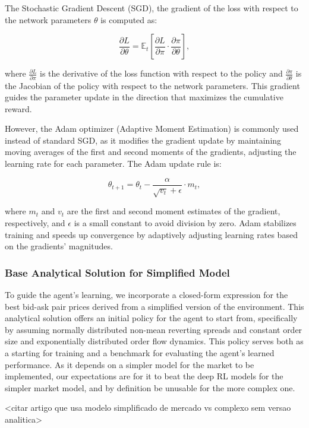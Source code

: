 The Stochastic Gradient Descent (SGD), the gradient of the loss with respect to the network parameters \( \theta \) is computed as:

$$
\frac{\partial L}{\partial \theta} = \mathbb{E}_t \left[ \frac{\partial L}{\partial \pi} \cdot \frac{\partial \pi}{\partial \theta} \right],
$$

where $\frac{\partial L}{\partial \pi}$ is the derivative of the loss function with respect to the policy and $\frac{\partial \pi}{\partial \theta}$ is the Jacobian of the policy with respect to the network parameters. This gradient guides the parameter update in the direction that maximizes the cumulative reward.

However, the Adam optimizer (Adaptive Moment Estimation) is commonly used instead of standard SGD, as it modifies the gradient update by maintaining moving averages of the first and second moments of the gradients, adjusting the learning rate for each parameter. The Adam update rule is:

$$
\theta_{t+1} = \theta_t - \frac{\alpha}{\sqrt{v_t} + \epsilon} \cdot m_t,
$$

where $m_t$ and $v_t$ are the first and second moment estimates of the gradient, respectively, and $\epsilon$ is a small constant to avoid division by zero. Adam stabilizes training and speeds up convergence by adaptively adjusting learning rates based on the gradients' magnitudes.

\subsubsection{Base Analytical Solution for Simplified Model}

To guide the agent's learning, we incorporate a closed-form expression for the best bid-ask pair prices derived from a simplified version of the environment. This analytical solution offers an initial policy for the agent to start from, specifically by assuming normally distributed non-mean reverting spreads and constant order size and exponentially distributed order flow dynamics. This policy serves both as a starting for training and a benchmark for evaluating the agent’s learned performance. As it depends on a simpler model for the market to be implemented, our expectations are for it to beat the deep RL models for the simpler market model, and by definition be unusable for the more complex one.

<citar artigo que usa modelo simplificado de mercado vs complexo sem versao analitica>